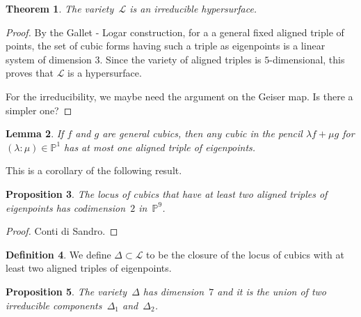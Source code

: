 \documentclass[11pt, a4paper, reqno, captions=tableheading,bibliography=totoc]{scrartcl}
\theoremstyle{plain}
\newtheorem{lemma}{Lemma}[section]
\newtheorem{prop}[lemma]{Proposition}
\newtheorem{theorem}[lemma]{Theorem}
\theoremstyle{definition}
\newtheorem{definition}[lemma]{Definition}
\newcommand{\p}{\mathbb{P}}
\begin{document}
\begin{theorem}
The variety~$\mathcal{L}$ is an irreducible hypersurface.
\end{theorem}

\begin{proof}
By the Gallet - Logar construction, for a a general fixed aligned triple of points, the set of cubic forms having such a triple as eigenpoints is a linear system of dimension 3. Since the variety of aligned triples is $5$-dimensional, this proves that $\mathcal{L}$ is a hypersurface.

For the irreducibility, we maybe need the argument on the Geiser map. Is there a simpler one?
\end{proof}

\begin{lemma}
\label{lemma:pencil_one_aligned}
 If $f$ and $g$ are general cubics, then any cubic in the pencil $\lambda f + \mu g$ for $(\lambda: \mu) \in \p^1$ has at most one aligned triple of eigenpoints.
\end{lemma}

This is a corollary of the following result.

\begin{prop}
    The locus of cubics that have at least two aligned triples of eigenpoints has codimension~$2$ in~$\p^9$.
\end{prop}
\begin{proof}
    Conti di Sandro.
\end{proof}

\begin{definition}
 We define $\Delta \subset \mathcal{L}$ to be the closure of the locus of cubics with at least two aligned triples of eigenpoints.
\end{definition}

\begin{prop}
  The variety~$\Delta$ has dimension~$7$ and it is the union of two irreducible components~$\Delta_1$ and~$\Delta_2$.
\end{prop}
\end{document}

